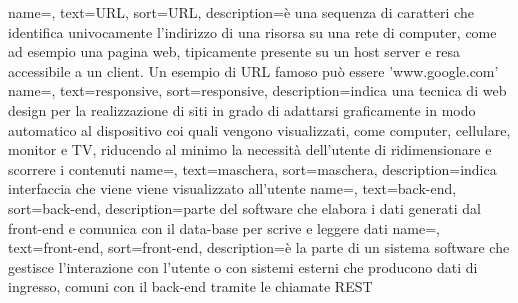 {
    name=,
    text=URL,
    sort=URL,
    description={è una sequenza di caratteri che identifica univocamente l'indirizzo di una risorsa su una rete di computer, come ad esempio una pagina web, tipicamente presente su un host server e resa accessibile a un client. Un esempio di URL famoso può essere 'www.google.com'}
}
{
    name=,
    text=responsive,
    sort=responsive,
    description={indica una tecnica di web design per la realizzazione di siti in grado di adattarsi graficamente in modo automatico al dispositivo coi quali vengono visualizzati, come computer, cellulare, monitor e TV, riducendo al minimo la necessità dell'utente di ridimensionare e scorrere i contenuti}
}
{
    name=,
    text=maschera,
    sort=maschera,
    description={indica interfaccia che viene viene visualizzato all'utente}
}
{
    name=,
    text=back-end,
    sort=back-end,
    description={parte del software che elabora i dati generati dal front-end e comunica con il data-base per scrive e leggere dati}
}
{
    name=,
    text=front-end,
    sort=front-end,
    description={è la parte di un sistema software che gestisce l'interazione con l'utente o con sistemi esterni che producono dati di ingresso, comuni con il back-end tramite le chiamate REST}
}





